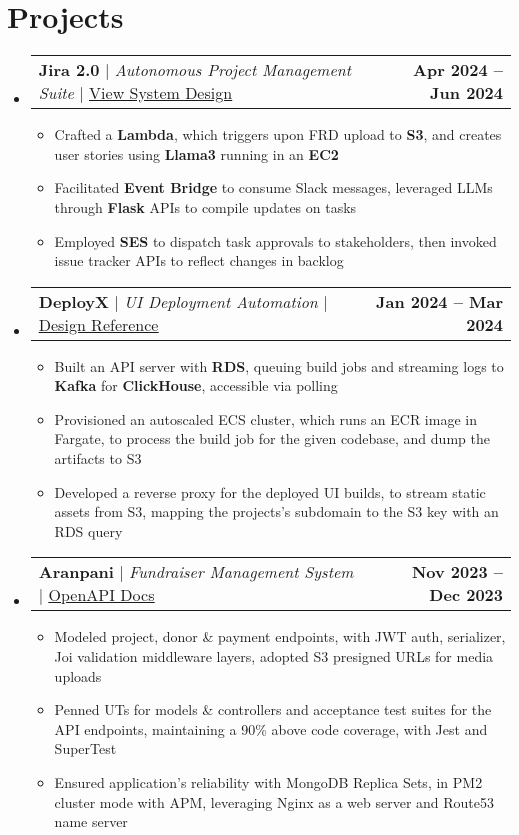 \documentclass[letterpaper,11pt]{article}
\makeatletter
\newcommand{\resumeItem}[1]{
  \item\small{
    {#1 \vspace{-2pt}}
  }
}
\newcommand{\resumeProjectHeading}[2]{
    \item
    \begin{tabular*}{1.001\textwidth}{l@{\extracolsep{\fill}}r}
      \small#1 & \textbf{\small #2}\\
    \end{tabular*}\vspace{-7pt}
}
\newcommand{\resumeSubHeadingListStart}{\begin{itemize}[leftmargin=0.0in, label={}]}
\newcommand{\resumeSubHeadingListEnd}{\end{itemize}}
\newcommand{\resumeItemListStart}{\begin{itemize}}
\newcommand{\resumeItemListEnd}{\end{itemize}\vspace{-5pt}}
\makeatother
\begin{document}
\section{Projects}
    \vspace{-5pt}
    \resumeSubHeadingListStart
      \resumeProjectHeading
          {\textbf{Jira 2.0} $|$ \textit{Autonomous Project Management Suite} $|$ \href{https://gist.github.com/kr-aashish/5d1b184bb082b29c0534861d07c2f25a}{\underline{View System Design}}}{Apr 2024 -- Jun 2024}
          \resumeItemListStart
            \resumeItem{Crafted a \textbf{Lambda}, which triggers upon FRD upload to \textbf{S3}, and creates user stories using \textbf{Llama3} running in an \textbf{EC2}}
            \resumeItem{Facilitated \textbf{Event Bridge} to consume Slack messages, leveraged LLMs through \textbf{Flask} APIs to compile updates on tasks}
            \resumeItem{Employed \textbf{SES} to dispatch task approvals to stakeholders, then invoked issue tracker APIs to reflect changes in backlog}
          \resumeItemListEnd
          \vspace{-13pt}
      \resumeProjectHeading
          {\textbf{DeployX} $|$ \textit{UI Deployment Automation} $|$ \href{https://vercel.com/blog/behind-the-scenes-of-vercels-infrastructure}{\underline{Design Reference}}}{Jan 2024 -- Mar 2024}
          \resumeItemListStart
            \resumeItem{Built an API server with \textbf{RDS}, queuing build jobs and streaming logs to \textbf{Kafka} for \textbf{ClickHouse}, accessible via polling}
            \resumeItem{Provisioned an auto\textendash scaled ECS cluster, which runs an ECR image in Fargate, to process the build job for the given codebase, and dump the artifacts to S3}
            \resumeItem{Developed a reverse proxy for the deployed UI builds, to stream static assets from S3, mapping the projects's subdomain to the S3 key with an RDS query}
          \resumeItemListEnd
          \vspace{-13pt}
      \resumeProjectHeading
          {\textbf{Aranpani} $|$ \textit{Fundraiser Management System} $|$ \href{https://kr-aashish.github.io/aranpani-api-docs}{\underline{OpenAPI Docs}}}{Nov 2023 -- Dec 2023}
          \resumeItemListStart
            \resumeItem{Modeled project, donor \& payment endpoints, with JWT auth, serializer, Joi validation middleware layers, adopted S3 pre\textendash signed URLs for media uploads}
            \resumeItem{Penned UTs for models \& controllers and acceptance test suites for the API endpoints, maintaining a 90\% above code coverage, with Jest and SuperTest}
            \resumeItem{Ensured application's reliability with MongoDB Replica Sets, in PM2 cluster mode with APM, leveraging Nginx as a web server and Route53 name server}
          \resumeItemListEnd
    \resumeSubHeadingListEnd
\vspace{-15pt}
\end{document}

